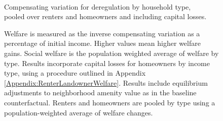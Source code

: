 \documentclass[12pt]{article}
\begin{document}
	\begin{figure}[htbp!]
		\begin{center}
			\caption{ \\ Compensating variation for deregulation by household type, \\ pooled over renters and homeowners and including capital losses. }\label{figure:welfarePooled_ctfl}
		\end{center}
		\caption*{Welfare is measured as the inverse compensating variation as a percentage of initial income. Higher values mean higher welfare gains. Social welfare is the population weighted average of welfare by type. Results incorporate capital losses for homeowners by income type, using a procedure outlined in Appendix \ref{Appendix:RenterLandownerWelfare}. Results include equilibrium adjustments to neighborhood amenity value as in the baseline counterfactual. Renters and homeowners are pooled by type using a population-weighted average of welfare changes.}
	\end{figure}
	
\end{document}
